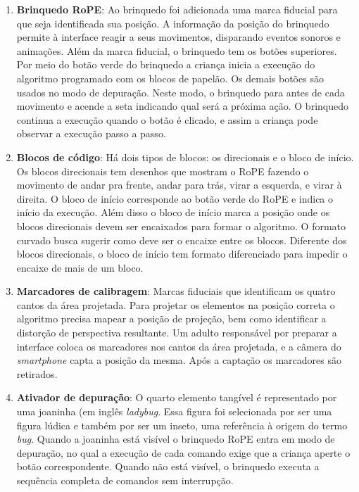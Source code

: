 \begin{enumerate}
\item \textbf{Brinquedo RoPE}: Ao brinquedo foi adicionada uma marca fiducial para que seja identificada sua posição. A informação da posição do brinquedo permite à interface reagir a seus movimentos, disparando eventos sonoros e animações. Além da marca fiducial, o brinquedo tem os botões superiores. Por meio do botão verde do brinquedo a criança inicia a execução do algoritmo programado com os blocos de papelão. Os demais botões são usados no modo de depuração. Neste modo, o brinquedo para antes de cada movimento e acende a seta indicando qual será a próxima ação. O brinquedo continua a execução quando o botão é clicado, e assim a criança pode observar a execução passo a passo.
\item \textbf{Blocos de código}:  Há dois tipos de blocos: os direcionais e o bloco de início. Os blocos direcionais tem desenhos que mostram o RoPE fazendo o movimento de andar pra frente, andar para trás, virar a esquerda, e virar à direita. O bloco de início corresponde ao botão verde do RoPE e indica o início da execução. Além disso o bloco de início marca a posição onde os blocos direcionais devem ser encaixados para formar o algoritmo. O formato curvado busca sugerir como deve ser o encaixe entre os blocos. Diferente dos blocos direcionais, o bloco de início tem formato diferenciado para impedir o encaixe de mais de um bloco.
\item \textbf{Marcadores de calibragem}: Marcas fiduciais que identificam os quatro cantos da área projetada. Para projetar os elementos na posição correta o algoritmo precisa mapear a posição de projeção, bem como identificar a distorção de perspectiva resultante. Um adulto responsável por preparar a interface coloca os marcadores nos cantos da área projetada, e a câmera do \textit{smartphone} capta a posição da mesma. Após a captação os marcadores são retirados.
\item \textbf{Ativador de depuração}: O quarto elemento tangível é representado por uma joaninha (em inglês \textit{ladybug}. Essa figura foi selecionada por ser uma figura lúdica e também por ser um inseto, uma referência à origem do termo \textit{bug}. Quando a joaninha está visível o brinquedo RoPE entra em modo de depuração, no qual a execução de cada comando exige que a criança aperte o botão correspondente. Quando não está visível, o brinquedo executa a sequência completa de comandos sem interrupção.
\end{enumerate}

